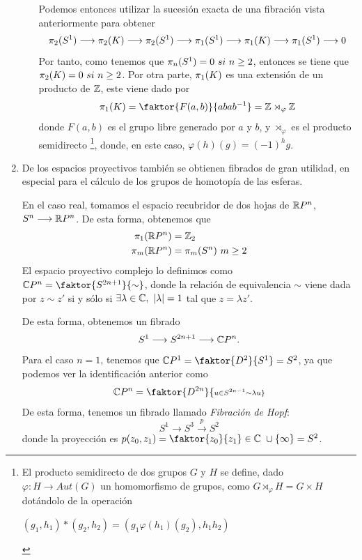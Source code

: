 \begin{enumerate}
\begin{enumerate}
Podemos entonces utilizar la sucesión exacta de una fibración vista anteriormente para obtener
\[
\homot{2}{S^1} \longrightarrow \homot{2}{K} \longrightarrow \homot{2}{S^1} \longrightarrow \homot{1}{S^1} \longrightarrow \homot{1}{K} \longrightarrow \homot{1}{S^1} \longrightarrow 0
\]
Por tanto, como tenemos que $\pi_{n}(S^1) = 0 \ si \ n \geq 2$, entonces  se tiene que $\homot{2}{K} = 0 \ si \ n \geq 2$. Por otra parte,  $\pi_{1}(K) $ es una extensión de un producto de $\mathbb{Z}$, este viene dado por 
\[
\homot{1}{K} = \faktor{F(a,b)}{abab^{-1}} = \bb{Z} \rtimes_\varphi \bb{Z}
\]
donde $F(a,b)$ es el grupo libre generado por $a$ y $b$, y  $\rtimes_\varphi$ es el producto semidirecto \footnote{El producto semidirecto de dos grupos $G$ y $H$ se define, dado $\varphi : H \longrightarrow Aut(G)$ un homomorfismo de grupos, como $G \rtimes_\varphi H = G \times H$ dotándolo de la operación
\begin{center}
$(g_1, h_1) \ast (g_2, h_2) = (g_1 \varphi(h_1)(g_2), h_1 h_2)$
\end{center}}, donde, en este caso, $\varphi(h)(g) = (-1)^hg$.
\end{enumerate}
\item De los espacios proyectivos también se obtienen fibrados de gran utilidad, en especial para el cálculo de los grupos de homotopía de las esferas. \par
En el caso real, tomamos el espacio recubridor de dos hojas de $\mathbb{R}P^n$, $S^n \longrightarrow \bb{R}P^n$. De esta forma, obtenemos que 
\begin{align*}
\pi_{1}(\mathbb{R}P^n) &= \mathbb{Z}_2 \\
\pi_{m}(\mathbb{R}P^n) &= \pi_{m}(S^n) \ m \geq 2
\end{align*}
El espacio proyectivo complejo lo definimos como $\bb{C}P^n = \faktor{S^{2n+1}}{\sim}$, donde la relación de equivalencia $\sim$ viene dada por $z \sim z'$ si y sólo si $\exists \lambda \in \bb{C}, \ |\lambda| = 1$ tal que $z = \lambda z'$. \par
De esta forma, obtenemos un fibrado
\[
S^1 \longrightarrow S^{2n+1} \longrightarrow \bb{C}P^n.
\]
Para el caso $n = 1$, tenemos que $\bb{C}P^1 = \faktor{D^2}{S^1} = S^2$, ya que podemos ver la identificación anterior como 
\[
\bb{C}P^n = \faktor{D^{2n}}{\scriptstyle u \in S^{2n-1} \sim \lambda u}
\]
De esta forma, tenemos un fibrado llamado \textit{Fibración de Hopf}:
\[
S^1 \longrightarrow S^3 \stackrel{p}{\longrightarrow} S^2
\]
donde la proyección es $p(z_0, z_1) = \faktor{z_0}{z_1} \in \bb{C} \ \cup \{\infty \} = S^2$. \par

\end{enumerate}

